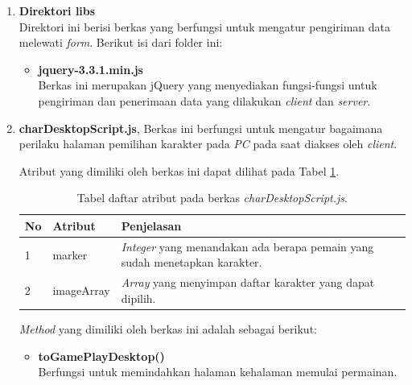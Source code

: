 \begin{enumerate}
\begin{enumerate}
		\begin{enumerate}
			\item \textbf{Direktori libs} \\
			Direktori ini berisi berkas yang berfungsi untuk mengatur pengiriman data melewati \textit{form}. Berikut isi dari folder ini:
			\begin{itemize}
				\item \textbf{jquery-3.3.1.min.js} \\ Berkas ini merupakan jQuery yang menyediakan fungsi-fungsi untuk pengiriman dan penerimaan data yang dilakukan \textit{client} dan \textit{server}. 
			\end{itemize}
		
			\item \textbf{charDesktopScript.js}, Berkas ini berfungsi untuk mengatur bagaimana perilaku halaman pemilihan karakter pada \textit{PC} pada saat diakses oleh \textit{client}.
			
			Atribut yang dimiliki oleh berkas ini dapat dilihat pada Tabel \ref{table:atribut_charDesktopScript}.
			\begin{table}[H]
				\centering
				\caption{Tabel daftar atribut pada berkas \textit{charDesktopScript.js}.}
				\begin{tabular}{|p{0.35cm}|p{3cm}|p{7cm}|}
					\hline
					No & Atribut & Penjelasan \\ \hline
					1 & marker & \textit{Integer} yang menandakan ada berapa pemain yang sudah menetapkan karakter. \\ \hline
					2 & imageArray & \textit{Array} yang menyimpan daftar karakter yang dapat dipilih. \\ \hline
				\end{tabular}
				\label{table:atribut_charDesktopScript}
			\end{table}
			\textit{Method} yang dimiliki oleh berkas ini adalah sebagai berikut:
			\begin{itemize}
				\item \textbf{toGamePlayDesktop()} \\
				Berfungsi untuk memindahkan halaman kehalaman memulai permainan.
				

\end{itemize}
\end{enumerate}
\end{enumerate}
\end{enumerate}
